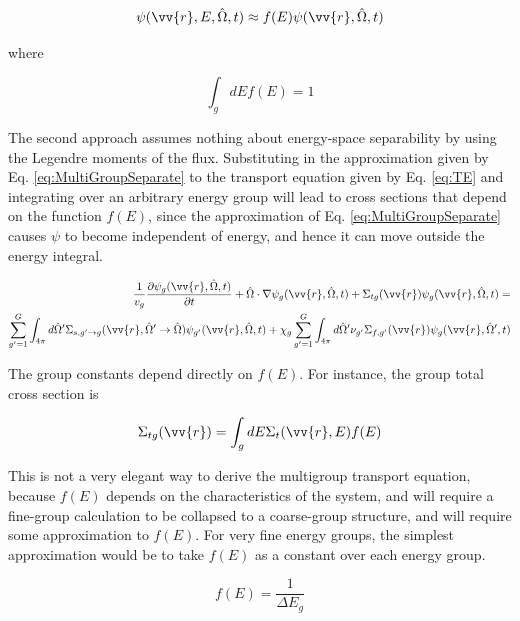 \documentclass[10pt]{article}
\newcommand{\hO}{\hat{\Omega}}
\begin{document}
\begin{flushleft}
\begin{equation}
\label{eq:MultiGroupSeparate}
\psi(\vv{r}, E, \hO  ,t) \approx f(E)\psi(\vv{r}, \hO  ,t)
\end{equation}

where

\begin{equation}
\label{eq:f_E_normalized}
\int_{g} dEf(E) = 1
\end{equation}

The second approach assumes nothing about energy-space separability by using the Legendre moments of the flux. Substituting in the approximation given by Eq. \ref{eq:MultiGroupSeparate} to the transport equation given by Eq. \ref{eq:TE} and integrating over an arbitrary energy group will lead to cross sections that depend on the function \(f(E)\), since the approximation of Eq. \ref{eq:MultiGroupSeparate} causes \(\psi\) to become independent of energy, and hence it can move outside the energy integral.

\begin{equation}
\label{eq:multigroupTE1}
\begin{aligned}
\frac{1}{v_g}\frac{\partial \psi_g(\vv{r}, \hO  , t)}{\partial t} + \hO  \cdot\nabla\psi_g(\vv{r}, \hO  , t) + \Sigma_{tg}(\vv{r})\psi_g(\vv{r}, \hO  , t) =\\
\sum_{g'=1}^{G} \int_{4\pi}^{} d\hO  ' \Sigma_{s, g'\rightarrow g}(\vv{r}, \hO  ' \rightarrow\hO  )\psi_{g'}(\vv{r}, \hO  , t) + \chi_g \sum_{g'=1}^{G}\int_{4\pi}^{} d\hO  ' \nu_{g'}\Sigma_{f,g'}(\vv{r})\psi_g(\vv{r}, \hO  ', t)
\end{aligned}
\end{equation}

The group constants depend directly on \(f(E)\). For instance, the group total cross section is

\begin{equation}
\label{eq:multigroupTE1_constants1}
\Sigma_{tg}(\vv{r}) = \int_{g} dE \Sigma_t(\vv{r}, E) f(E)
\end{equation}

This is not a very elegant way to derive the multigroup transport equation, because \(f(E)\) depends on the characteristics of the system, and will require a fine-group calculation to be collapsed to a coarse-group structure, and will require some approximation to \(f(E)\). For very fine energy groups, the simplest approximation would be to take \(f(E)\) as a constant over each energy group.

\begin{equation}
\label{eq:FineGroupf_E}
f(E) = \frac{1}{\Delta E_g}
\end{equation}


\end{flushleft}
\end{document}
